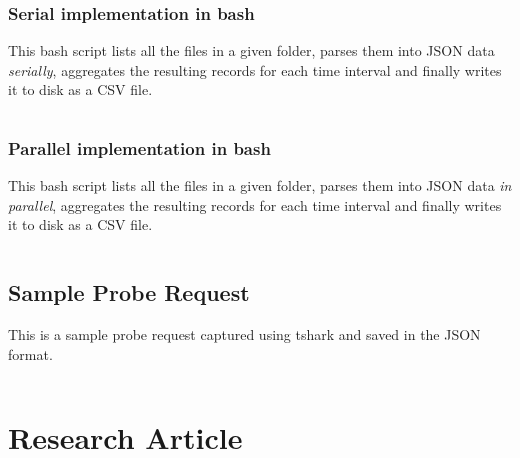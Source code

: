\subsection{Serial implementation in bash}
This bash script lists all the files in a given folder, parses them into JSON data \textit{serially}, aggregates the resulting records for each time interval and finally writes it to disk as a CSV file.
\vspace{1em}
\inputminted{bash}{analysis/data-toolkit/new-toolkit.sh}

\subsection{Parallel implementation in bash}

This bash script lists all the files in a given folder, parses them into JSON data \textit{in parallel}, aggregates the resulting records for each time interval and finally writes it to disk as a CSV file.
\vspace{1em}
\inputminted{bash}{analysis/data-toolkit/new-toolkit-parallel.sh}
\pagebreak


\section{Sample Probe Request} \label{appendix:sampleprobe}
This is a sample probe request captured using tshark and saved in the JSON format.

\vspace{1em}
\inputminted{javascript}{analysis/data-collection/samplepacket.json}


\chapter{Research Article}

